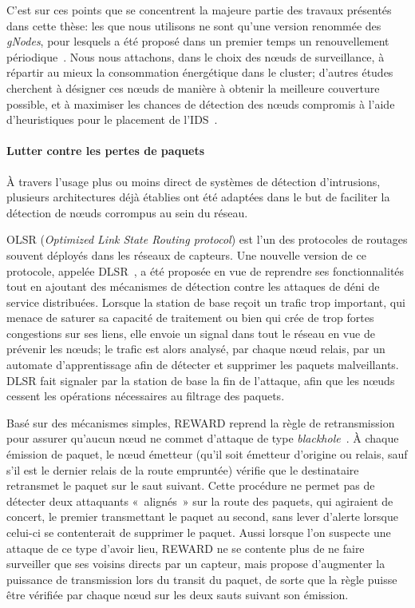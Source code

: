 C'est sur ces points que se concentrent la majeure partie des travaux présentés dans cette thèse: les \cns que nous utilisons ne sont qu'une version renommée des \textit{gNodes}, pour lesquels a été proposé dans un premier temps un renouvellement périodique~\cite{GMT12}.
Nous nous attachons, dans le choix des nœuds de surveillance, à répartir au mieux la consommation énergétique dans le cluster; d'autres études cherchent à désigner ces nœuds de manière à obtenir la meilleure couverture possible, et à maximiser les chances de détection des nœuds compromis à l'aide d'heuristiques pour le placement de l'IDS~\cite{INK09}.

        \paragraph{Lutter contre les pertes de paquets}
À travers l'usage plus ou moins direct de systèmes de détection d'intrusions, plusieurs architectures déjà établies ont été adaptées dans le but de faciliter la détection de nœuds corrompus au sein du réseau.

OLSR (\textit{Optimized Link State Routing protocol}) est l'un des protocoles de routages souvent déployés dans les réseaux de capteurs.
Une nouvelle version de ce protocole, appelée DLSR~\cite{MKASF10}, a été proposée en vue de reprendre ses fonctionnalités tout en ajoutant des mécanismes de détection contre les attaques de déni de service distribuées.
Lorsque la station de base reçoit un trafic trop important, qui menace de saturer sa capacité de traitement ou bien qui crée de trop fortes congestions sur ses liens, elle envoie un signal dans tout le réseau en vue de prévenir les nœuds; le trafic est alors analysé, par chaque nœud relais, par un automate d'apprentissage afin de détecter et supprimer les paquets malveillants.
DLSR fait signaler par la station de base la fin de l'attaque, afin que les nœuds cessent les opérations nécessaires au filtrage des paquets.

Basé sur des mécanismes simples, REWARD reprend la règle de retransmission pour assurer qu'aucun nœud ne commet d'attaque de type \textit{blackhole}~\cite{Kar05}.
À chaque émission de paquet, le nœud émetteur (qu'il soit émetteur d'origine ou relais, sauf s'il est le dernier relais de la route empruntée) vérifie que le destinataire retransmet le paquet sur le saut suivant.
Cette procédure ne permet pas de détecter deux attaquants « alignés » sur la route des paquets, qui agiraient de concert, le premier transmettant le paquet au second, sans lever d'alerte lorsque celui-ci se contenterait de supprimer le paquet.
Aussi lorsque l'on suspecte une attaque de ce type d'avoir lieu, REWARD ne se contente plus de ne faire surveiller que ses voisins directs par un capteur, mais propose d'augmenter la puissance de transmission lors du transit du paquet, de sorte que la règle puisse être vérifiée par chaque nœud sur les deux sauts suivant son émission.

